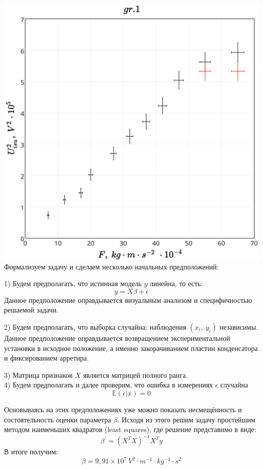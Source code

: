 \includegraphics[scale = 0.20]{my_plot1.png}\\

Формализуем задачу и сделаем несколько начальных предположений:

1) Будем предполагать, что истинная модель $y$ линейна, то есть: 
$$ y = X\beta + \epsilon $$
Данное предположение оправдывается визуальным анализом и специфичностью решаемой задачи. 

2) Будем предполагать, что выборка случайна: наблюдения $(x_i,~y_i)$ независимы.
Данное предположение оправдывается возвращением экспериментальной установки в исходное положение, а именно закорачиванием пластин конденсатора и фиксированием арретира.

3) Матрица признаков $X$ является матрицей полного ранга. \\

4) Будем предполагать и далее проверим, что ошибка в измерениях $\epsilon$ случайна
$$ \mathds{E}(\epsilon | x) = 0$$

Основываясь на этих предположениях уже можно показать несмещённость и состоятельность оценки параметра $\beta$. Исходя из этого решим задачу простейшим методом наименьших квадратов (least squares), где решение представимо в виде: 
$$ \beta^{'}=(X^T X)^{-1}X^T y $$
В итоге получим:
$$ \beta = 9,91 \times 10^7 \ V^2 \cdot m^{-1} \cdot kg^{-1} \cdot s^2$$\\

